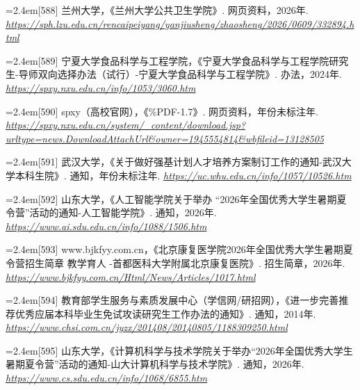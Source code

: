 {\par\noindent\hangindent=2.4em\label{src:S0334}{\color{cAccent}[588]} 兰州大学，《兰州大学公共卫生学院》. 网页资料，2026年. \textit{\url{https://sph.lzu.edu.cn/rencaipeiyang/yanjiusheng/zhaosheng/2026/0609/332894.html}}\par
\par\noindent\hangindent=2.4em\label{src:S0338}{\color{cAccent}[589]} 宁夏大学食品科学与工程学院，《宁夏大学食品科学与工程学院研究生-导师双向选择办法（试行）-宁夏大学食品科学与工程学院》. 办法，2024年. \textit{\url{https://spxy.nxu.edu.cn/info/1053/3060.htm}}\par
\par\noindent\hangindent=2.4em\label{src:S0339}{\color{cAccent}[590]} spxy（高校官网），《\%PDF-1.7》. 网页资料，年份未标注年. \textit{\url{https://spxy.nxu.edu.cn/system/_content/download.jsp?urltype=news.DownloadAttachUrl\&owner=1945554814\&wbfileid=13128505}}\par
\par\noindent\hangindent=2.4em\label{src:S0346}{\color{cAccent}[591]} 武汉大学，《关于做好强基计划人才培养方案制订工作的通知-武汉大学本科生院》. 通知，年份未标注年. \textit{\url{https://uc.whu.edu.cn/info/1057/10526.htm}}\par
\par\noindent\hangindent=2.4em\label{src:S0351}{\color{cAccent}[592]} 山东大学，《人工智能学院关于举办 “2026年全国优秀大学生暑期夏令营”活动的通知-人工智能学院》. 通知，2026年. \textit{\url{https://www.ai.sdu.edu.cn/info/1088/1506.htm}}\par
\par\noindent\hangindent=2.4em\label{src:S0353}{\color{cAccent}[593]} www.bjkfyy.com.cn，《北京康复医学院2026年全国优秀大学生暑期夏令营招生简章 教学育人 -首都医科大学附属北京康复医院》. 招生简章，2026年. \textit{\url{https://www.bjkfyy.com.cn/Html/News/Articles/1017.html}}\par
\par\noindent\hangindent=2.4em\label{src:S0354}{\color{cAccent}[594]} 教育部学生服务与素质发展中心（学信网/研招网），《进一步完善推荐优秀应届本科毕业生免试攻读研究生工作办法的通知》. 通知，2014年. \textit{\url{https://www.chsi.com.cn/jyzx/201408/20140805/1188309250.html}}\par
\par\noindent\hangindent=2.4em\label{src:S0357}{\color{cAccent}[595]} 山东大学，《计算机科学与技术学院关于举办“2026年全国优秀大学生暑期夏令营”活动的通知-山大计算机科学与技术学院》. 通知，2026年. \textit{\url{https://www.cs.sdu.edu.cn/info/1068/6855.htm}}\par
}
